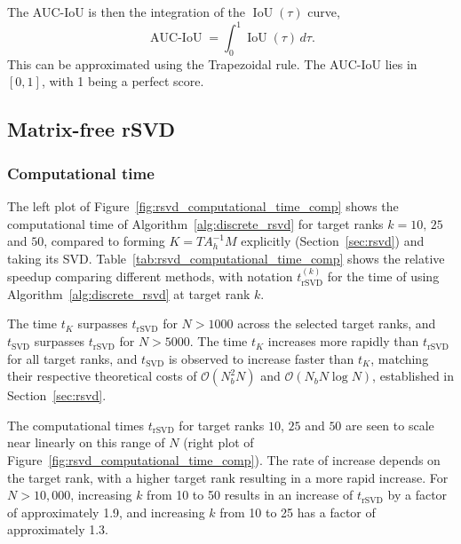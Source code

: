 The AUC-IoU is then the integration of the $\operatorname{IoU}(\tau)$ curve,
\begin{equation*}
    \operatorname{AUC-IoU} = \int_{0}^{1} \operatorname{IoU}(\tau) \, d\tau.
\end{equation*}
This can be approximated using the Trapezoidal rule. The AUC-IoU lies in $[0, 1]$, with 1 being a perfect score.


\subsection{Matrix-free rSVD}
\subsubsection{Computational time}\label{sec:computational_time}


The left plot of Figure~\ref{fig:rsvd_computational_time_comp} shows the computational time of Algorithm~\ref{alg:discrete_rsvd} for target ranks $k = 10,\, 25$ and $50$, compared to forming $K = T A_h^{-1} M$ explicitly (Section~\ref{sec:rsvd}) and taking its SVD. Table~\ref{tab:rsvd_computational_time_comp} shows the relative speedup comparing different methods, with notation $t^{(k)}_{\text{rSVD}}$ for the time of using Algorithm~\ref{alg:discrete_rsvd} at target rank $k$.

The time $t_K$ surpasses $t_{\text{rSVD}}$ for $N > 1000$ across the selected target ranks, and $t_{\text{SVD}}$ surpasses $t_{\text{rSVD}}$ for $N > 5000$. The time $t_{K}$ increases more rapidly than $t_{\text{rSVD}}$ for all target ranks, and $t_{\text{SVD}}$ is observed to increase faster than $t_{K}$, matching their respective theoretical costs of $\mathcal{O}(N_b^2 N)$ and $\mathcal{O}(N_b N \log N)$, established in Section~\ref{sec:rsvd}.
 
The computational times $t_{\text{rSVD}}$ for target ranks $10$, $25$ and $50$ are seen to scale near linearly on this range of $N$ (right plot of Figure~\ref{fig:rsvd_computational_time_comp}). The rate of increase depends on the target rank, with a higher target rank resulting in a more rapid increase. For $N>10{,}000$, increasing $k$ from 10 to 50 results in an increase of $t_{\text{rSVD}}$ by a factor of approximately 1.9, and increasing $k$ from 10 to 25 has a factor of approximately 1.3. 


